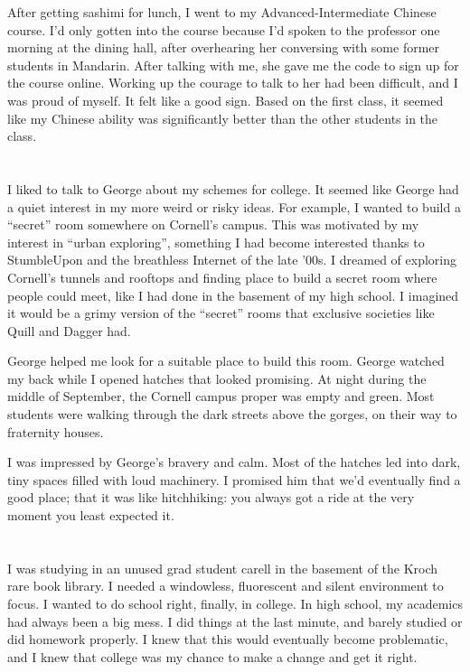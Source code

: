 After getting sashimi for lunch, I went to my Advanced-Intermediate Chinese
course.   I'd only gotten into the course because I'd spoken to the professor
one morning at the dining hall, after overhearing her conversing with some
former students in Mandarin.  After talking with me, she gave me the code to
sign up for the course online.  Working up the courage to talk to her had been
difficult, and I was proud of myself.  It felt like a good sign. Based on the
first class, it seemed like my Chinese ability was significantly better than the
other students in the class.

\section{}

I liked to talk to George about my schemes for college.  It seemed like George
had a quiet interest in my more weird or risky ideas.  For example, I wanted to
build a ``secret'' room somewhere on Cornell's campus.  This was motivated by my
interest in ``urban exploring'', something I had become interested thanks to
StumbleUpon and the breathless Internet of the late '00s.  I dreamed of
exploring Cornell's tunnels and rooftops and finding place to build a secret
room where people could meet, like I had done in the basement of my high school.
I imagined it would be a grimy version of the ``secret'' rooms that exclusive
societies like Quill and Dagger had. 

George helped me look for a suitable place to build this room.  George watched
my back while I opened hatches that looked promising.  At night during the
middle of September, the Cornell campus proper was empty and green.  Most students
were walking through the dark streets above the gorges, on their way to
fraternity houses.

I was impressed by George's bravery and calm.  Most of the hatches led into
dark, tiny spaces filled with loud machinery.  I promised him that we'd
eventually find a good place; that it was like hitchhiking: you always got a
ride at the very moment you least expected it.

\section{}

I was studying in an unused grad student carell in the basement of the Kroch
rare book library.  I needed a windowless, fluorescent and silent environment to
focus.  I wanted to do school right, finally, in college.  In high school, my
academics had always been a big mess.  I did things at the last minute, and
barely studied or did homework properly.  I knew that this would eventually
become problematic, and I knew that college was my chance to make a change and
get it right. 

